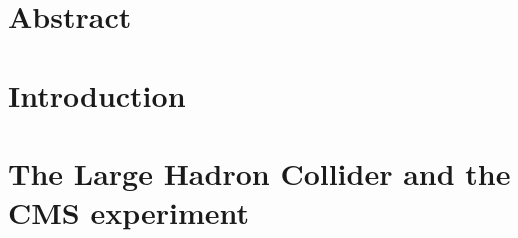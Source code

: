 \documentclass[11pt, a4paper]{book}
\begin{document}
\newpage\null\thispagestyle{empty}\newpage
\thispagestyle{empty}

\frontmatter %
\tableofcontents

\linenumbers
\chapter*{Abstract} 
\mainmatter %

\chapter{Introduction}%
%



\chapter{The Large Hadron Collider and the CMS experiment}%
%



%

%

%

%

%

%

%



\clearpage


%

\end{document}
